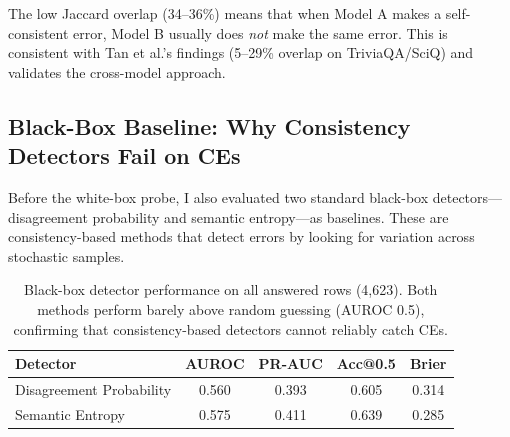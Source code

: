 \documentclass[11pt]{article}
\begin{document}
The low Jaccard overlap (34--36\%) means that when Model A makes a self-consistent error, Model B usually does \emph{not} make the same error. This is consistent with Tan et al.'s findings (5--29\% overlap on TriviaQA/SciQ) and validates the cross-model approach.

\subsection{Black-Box Baseline: Why Consistency Detectors Fail on CEs}

Before the white-box probe, I also evaluated two standard black-box detectors---disagreement probability and semantic entropy---as baselines. These are consistency-based methods that detect errors by looking for variation across stochastic samples.

\begin{table}[H]
\centering
\begin{tabular}{lcccc}
\toprule
\textbf{Detector} & \textbf{AUROC} & \textbf{PR-AUC} & \textbf{Acc@0.5} & \textbf{Brier} \\
\midrule
Disagreement Probability & 0.560 & 0.393 & 0.605 & 0.314 \\
Semantic Entropy         & 0.575 & 0.411 & 0.639 & 0.285 \\
\bottomrule
\end{tabular}
\caption{Black-box detector performance on all answered rows (4,623). Both methods perform barely above random guessing (AUROC 0.5), confirming that consistency-based detectors cannot reliably catch CEs.}
\label{tab:bbbaseline}
\end{table}
\end{document}
